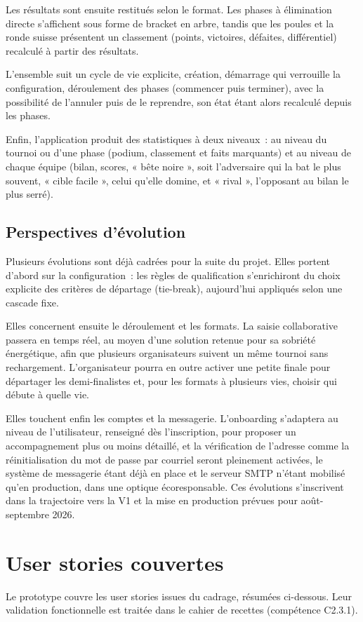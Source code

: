 Les résultats sont ensuite restitués selon le format. Les phases à élimination directe s'affichent sous forme de bracket en arbre, tandis que les poules et la ronde suisse présentent un classement (points, victoires, défaites, différentiel) recalculé à partir des résultats.

L'ensemble suit un cycle de vie explicite, création, démarrage qui verrouille la configuration, déroulement des phases (commencer puis terminer), avec la possibilité de l'annuler puis de le reprendre, son état étant alors recalculé depuis les phases.

Enfin, l'application produit des statistiques à deux niveaux~: au niveau du tournoi ou d'une phase (podium, classement et faits marquants) et au niveau de chaque équipe (bilan, scores, « bête noire », soit l'adversaire qui la bat le plus souvent, « cible facile », celui qu'elle domine, et « rival », l'opposant au bilan le plus serré).

\subsection{Perspectives d'évolution}
Plusieurs évolutions sont déjà cadrées pour la suite du projet. Elles portent d'abord sur la configuration~: les règles de qualification s'enrichiront du choix explicite des critères de départage (tie-break), aujourd'hui appliqués selon une cascade fixe.

Elles concernent ensuite le déroulement et les formats. La saisie collaborative passera en temps réel, au moyen d'une solution retenue pour sa sobriété énergétique, afin que plusieurs organisateurs suivent un même tournoi sans rechargement. L'organisateur pourra en outre activer une petite finale pour départager les demi-finalistes et, pour les formats à plusieurs vies, choisir qui débute à quelle vie.

Elles touchent enfin les comptes et la messagerie. L'onboarding s'adaptera au niveau de l'utilisateur, renseigné dès l'inscription, pour proposer un accompagnement plus ou moins détaillé, et la vérification de l'adresse comme la réinitialisation du mot de passe par courriel seront pleinement activées, le système de messagerie étant déjà en place et le serveur SMTP n'étant mobilisé qu'en production, dans une optique écoresponsable. Ces évolutions s'inscrivent dans la trajectoire vers la V1 et la mise en production prévues pour août-septembre 2026.

\section{User stories couvertes}
Le prototype couvre les user stories issues du cadrage, résumées ci-dessous. Leur validation fonctionnelle est traitée dans le cahier de recettes (compétence C2.3.1).

